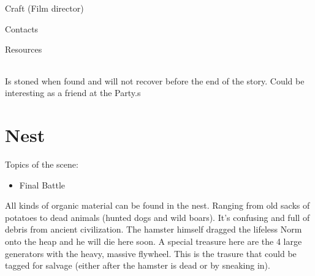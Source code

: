 \begin{npcBox}[title=Lucien\, Director]

    \begin{aspects}
    \item {}
    \item {}    
    \end{aspects}
    
    \begin{skills}
    \item {} Craft (Film director)
    \item {} Contacts
    \item {} Resources
    \end{skills}
    
    \begin{stressSection}
    \end{stressSection}
    \begin{tabularx}{\textwidth}{ XX }
    \end{tabularx}
    
    \begin{consequences}
    \item {}
    \item {}
    \item {}
    \end{consequences}
    
    \begin{npcDescription}
    Is stoned when found and will not recover before the end of the story. Could be interesting as a friend at the Party.s
    \end{npcDescription}
    
\end{npcBox}

\section{Nest}

Topics of the scene:
\begin{itemize}
\item Final Battle
\end{itemize}

All kinds of organic material can be found in the nest. Ranging from old sacks of potatoes to dead animals (hunted dogs and wild boars).
It's confusing and full of debris from ancient civilization.
The hamster himself dragged the lifeless Norm onto the heap and he will die here soon.
A special treasure here are the 4 large generators with the heavy, massive flywheel. This is the trasure that could be tagged for salvage (either after the hamster is dead or by sneaking in). 

